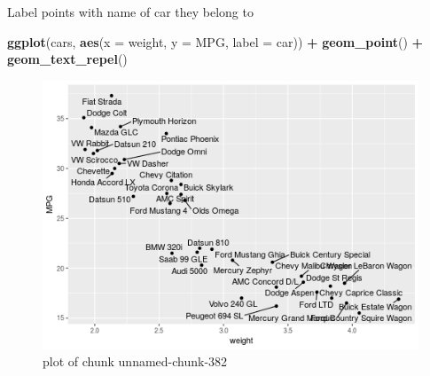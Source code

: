 \documentclass[ignorenonframetext,]{beamer}
\newenvironment{Shaded}{\begin{snugshade}}{\end{snugshade}}
\newcommand{\DataTypeTok}[1]{\textcolor[rgb]{0.13,0.29,0.53}{#1}}
\newcommand{\KeywordTok}[1]{\textcolor[rgb]{0.13,0.29,0.53}{\textbf{#1}}}
\newcommand{\NormalTok}[1]{#1}
\newcommand{\OperatorTok}[1]{\textcolor[rgb]{0.81,0.36,0.00}{\textbf{#1}}}
\newcommand{\StringTok}[1]{\textcolor[rgb]{0.31,0.60,0.02}{#1}}
\begin{document}
\begin{frame}[fragile]{Label points with name of car they belong to}
\protect\hypertarget{label-points-with-name-of-car-they-belong-to}{}

\begin{Shaded}
\begin{Highlighting}[]
\KeywordTok{ggplot}\NormalTok{(cars, }\KeywordTok{aes}\NormalTok{(}\DataTypeTok{x =}\NormalTok{ weight, }\DataTypeTok{y =}\NormalTok{ MPG, }\DataTypeTok{label =}\NormalTok{ car)) }\OperatorTok{+}
\StringTok{  }\KeywordTok{geom_point}\NormalTok{() }\OperatorTok{+}\StringTok{ }\KeywordTok{geom_text_repel}\NormalTok{()}
\end{Highlighting}
\end{Shaded}

\begin{figure}
\centering
\includegraphics{figure/unnamed-chunk-382-1.png}
\caption{plot of chunk unnamed-chunk-382}
\end{figure}

\end{frame}
\end{document}
